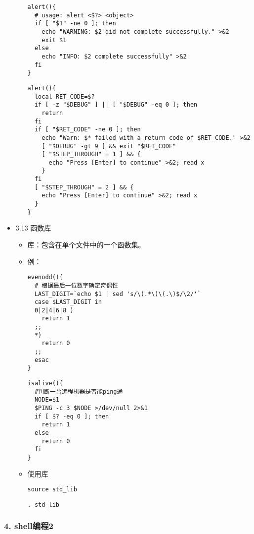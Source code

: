 \documentclass[bigger]{beamer}
\begin{document}
\begin{frame}[fragile]
\begin{itemize}
\begin{itemize}
\begin{verbatim}
alert(){
  # usage: alert <$?> <object>
  if [ "$1" -ne 0 ]; then
    echo "WARNING: $2 did not complete successfully." >&2
    exit $1
  else
    echo "INFO: $2 complete successfully" >&2
  fi
}
\end{verbatim}

\begin{verbatim}
alert(){
  local RET_CODE=$?
  if [ -z "$DEBUG" ] || [ "$DEBUG" -eq 0 ]; then
    return
  fi
  if [ "$RET_CODE" -ne 0 ]; then
    echo "Warn: $* failed with a return code of $RET_CODE." >&2
    [ "$DEBUG" -gt 9 ] && exit "$RET_CODE"
    [ "$STEP_THROUGH" = 1 ] && {
      echo "Press [Enter] to continue" >&2; read x
    }
  fi
  [ "$STEP_THROUGH" = 2 ] && {
    echo "Press [Enter] to continue" >&2; read x
  }
}
\end{verbatim}
\end{itemize}

\item 3.13 函数库
\label{sec-5-3-13}%
\begin{itemize}
\item 库：包含在单个文件中的一个函数集。
\item 例：

\begin{verbatim}
evenodd(){
  # 根据最后一位数字确定奇偶性
  LAST_DIGIT=`echo $1 | sed 's/\(.*\)\(.\)$/\2/'`
  case $LAST_DIGIT in
  0|2|4|6|8 )
    return 1
  ;;
  *)
    return 0
  ;;
  esac
}
\end{verbatim}

\begin{verbatim}
isalive(){
  #判断一台远程机器是否能ping通
  NODE=$1
  $PING -c 3 $NODE >/dev/null 2>&1
  if [ $? -eq 0 ]; then
    return 1
  else
    return 0
  fi
}
\end{verbatim}
\item 使用库

\begin{verbatim}
source std_lib
\end{verbatim}

\begin{verbatim}
. std_lib
\end{verbatim}
\end{itemize}
\end{itemize} %
\end{frame}
\begin{frame}
\frametitle{4. shell编程2}
\label{sec-5-4}
\end{frame}
\end{document}
